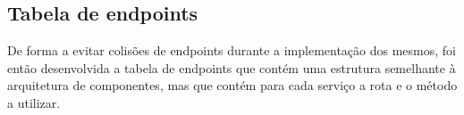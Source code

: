\newpage

\subsection{Tabela de endpoints}
De forma a evitar colisões de endpoints durante a implementação dos mesmos, foi então desenvolvida a 
tabela de endpoints que contém uma estrutura semelhante à arquitetura de componentes, mas que contém 
para cada serviço a rota e o método a utilizar.



\newpage
